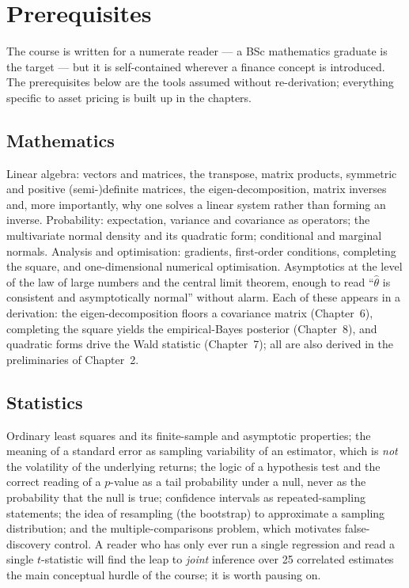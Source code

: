 \hypertarget{prerequisites}{%
\section{Prerequisites}\label{prerequisites}}

The course is written for a numerate reader --- a BSc mathematics
graduate is the target --- but it is self-contained wherever a finance
concept is introduced. The prerequisites below are the tools assumed
without re-derivation; everything specific to asset pricing is built up
in the chapters.

\hypertarget{mathematics}{%
\subsection{Mathematics}\label{mathematics}}

Linear algebra: vectors and matrices, the transpose, matrix products,
symmetric and positive (semi-)definite matrices, the eigen-decomposition,
matrix inverses and, more importantly, why one solves a linear system
rather than forming an inverse. Probability: expectation, variance and
covariance as operators; the multivariate normal density and its
quadratic form; conditional and marginal normals. Analysis and
optimisation: gradients, first-order conditions, completing the square,
and one-dimensional numerical optimisation. Asymptotics at the level of
the law of large numbers and the central limit theorem, enough to read
``$\hat\theta$ is consistent and asymptotically normal'' without alarm.
Each of these appears in a derivation: the eigen-decomposition floors a
covariance matrix (Chapter~6), completing the square yields the empirical-Bayes
posterior (Chapter~8), and quadratic forms drive the Wald statistic
(Chapter~7); all are also derived in the preliminaries of Chapter~2.

\hypertarget{statistics}{%
\subsection{Statistics}\label{statistics}}

Ordinary least squares and its finite-sample and asymptotic properties;
the meaning of a standard error as sampling variability of an estimator,
which is \emph{not} the volatility of the underlying returns; the logic
of a hypothesis test and the correct reading of a $p$-value as a
tail probability under a null, never as the probability that the null is
true; confidence intervals as repeated-sampling statements; the idea of
resampling (the bootstrap) to approximate a sampling distribution; and
the multiple-comparisons problem, which motivates false-discovery
control. A reader who has only ever run a single regression and read a
single $t$-statistic will find the leap to \emph{joint} inference over 25
correlated estimates the main conceptual hurdle of the course; it is
worth pausing on.

